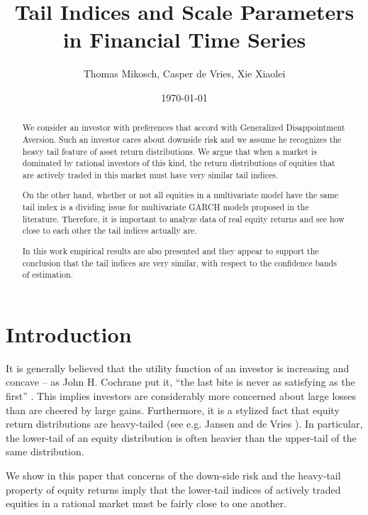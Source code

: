 \documentclass{article}
\title{Tail Indices and Scale Parameters in Financial Time Series}
\author{Thomas Mikosch, Casper de Vries, Xie Xiaolei}
\date{\today}
\newcommand{\1}[1]{
  \mathbf{1}_{\{#1\}}
}
\begin{document}
\maketitle

\begin{abstract}
We consider an investor with preferences that accord with Generalized
Disappointment Aversion. Such an investor cares about downside risk and
we assume he recognizes the heavy tail feature of asset return
distributions. We argue that when a market is dominated by rational
investors of this kind, the return distributions of equities that are
actively traded in this market must have very similar tail indices.

On the other hand, whether or not all equities in a multivariate model
have the same tail index is a dividing issue for multivariate GARCH
models proposed in the literature. Therefore, it is important to analyze
data of real equity returns and see how close to each other the
tail indices actually are.

In this work empirical results are also presented and they appear
to support the conclusion that the tail indices are very similar,
with respect to the confidence bands of estimation.
\end{abstract}

\section{Introduction}
It is generally believed that the utility function of an
investor is increasing and concave -- as John H. Cochrane
put it, ``the last bite is never as satisfying as the first''
\cite{cochrane2009asset}. This implies investors are considerably
more concerned about large losses than are cheered by large gains.
Furthermore, it is a stylized fact that equity return distributions
are heavy-tailed (see e.g. Jansen and de Vries \cite{jansen1991frequency}).
In particular, the lower-tail of an equity distribution is often heavier
than the upper-tail of the same distribution.

We show in this paper that concerns of the down-side risk and the
heavy-tail property of equity returns  imply that the lower-tail indices
of actively traded equities in a rational market must be fairly close to
one another.

\end{document}
